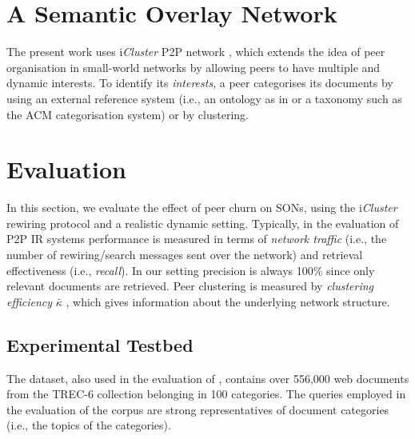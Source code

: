 \documentclass{llncs}
\newcommand{\iCluster}{i\textsl{Cluster} }
\begin{document}
\section{A Semantic Overlay Network} \label{sec:architecture}
The present work uses \iCluster P2P network \cite{raftopoulou08iCluster}, which extends the idea of peer organisation in small-world networks by allowing peers to have multiple and dynamic interests. To identify its \emph{interests}, a peer categorises its documents by using an external reference system (i.e., an ontology as in \cite{schmitz04self} or a taxonomy such as the ACM categorisation system) or by clustering.

\section{Evaluation} \label{sec:evaluation}
In this section, we evaluate the effect of peer churn on SONs, using the \iCluster rewiring protocol and a realistic dynamic setting.
Typically, in the evaluation of P2P IR systems performance is measured in terms of \emph{network traffic} (i.e., the number of rewiring/search messages sent over the network) and retrieval effectiveness (i.e., \emph{recall}). In our setting precision is always 100\% since only relevant documents are retrieved.
Peer clustering is measured by \emph{clustering efficiency} $\bar{\kappa}$ \cite{raftopoulou08measure}, which gives information about the underlying network structure.

\subsection{Experimental Testbed}
The dataset, also used in the evaluation of \cite{xu99cluster,rpt09rewiring}, contains over 556,000 web documents from the TREC-6 collection belonging in 100 categories. The queries employed in the evaluation of the corpus are strong representatives of document categories (i.e., the topics of the categories).
\end{document}
